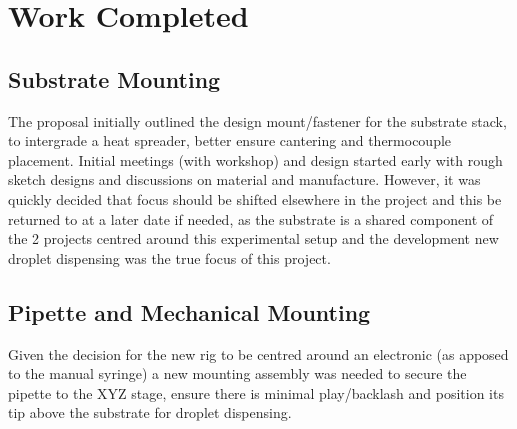 \chapter{Work Completed}\label{C:work}
\section{Substrate Mounting}
The proposal initially outlined the design mount/fastener for the substrate stack, to intergrade a heat spreader, better ensure cantering and thermocouple placement. Initial meetings (with workshop) and design started early with rough sketch designs and discussions on material and manufacture. However, it was quickly decided that focus should be shifted elsewhere in the project and this be returned to at a later date if needed, as the substrate is a shared component of the 2 projects centred around this experimental setup and the development new droplet dispensing was the true focus of this project.

\section{Pipette and Mechanical Mounting}
Given the decision for the new rig to be centred around an electronic (as apposed to the manual syringe) a new mounting assembly was needed to secure the pipette to the XYZ stage, ensure there is minimal play/backlash and position its tip above the substrate for droplet dispensing.

